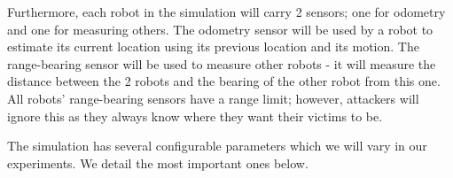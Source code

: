 Furthermore, each robot in the simulation will carry 2 sensors; one for odometry and one for measuring others. The odometry sensor will be used by a robot to estimate its current location using its previous location and its motion. The range-bearing sensor will be used to measure other robots - it will measure the distance between the 2 robots and the bearing of the other robot from this one. All robots' range-bearing sensors have a range limit; however, attackers will ignore this as they always know where they want their victims to be.

The simulation has several configurable parameters which we will vary in our experiments. We detail the most important ones below.

\renewcommand{\arraystretch}{1.35}
